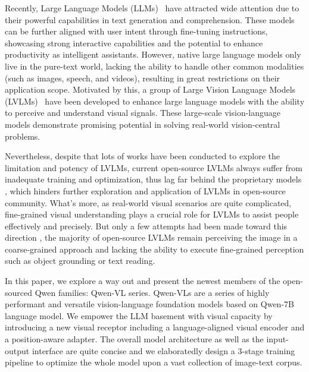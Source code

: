 \documentclass{article}
\begin{document}
Recently, Large Language Models (LLMs)~\citep{gpt3,gpt4,anil2023palm,gao2023llama,qwen7b} have attracted wide attention due to their powerful capabilities in text generation and comprehension. These models can be further aligned with user intent through fine-tuning instructions, showcasing strong interactive capabilities and the potential to enhance productivity as intelligent assistants.
However, native large language models only live in the pure-text world, lacking the ability to handle other common modalities (such as images, speech, and videos), resulting in great restrictions on their application scope.
Motivated by this, a group of Large Vision Language Models (LVLMs)~\citep{alayrac2022flamingo,chen2022pali, blip2,dai2023instructblip,kosmos,kosmos2,zhu2023minigpt,liu2023visual,ye2023mplug,mPLUG-DocOwl,shikra,li2023otter,videollama,emu,gpt4} have been developed to enhance large language models with the ability to perceive and understand visual signals. These large-scale vision-language models demonstrate promising potential in solving real-world vision-central problems.




Nevertheless, despite that lots of works have been conducted to explore the limitation and potency of LVLMs, current open-source LVLMs always suffer from inadequate training and optimization, thus lag far behind the proprietary models \citep{chen2022pali, chen2023pali, gpt4}, which hinders further exploration and application of LVLMs in open-source community.
What's more, as real-world visual scenarios are quite complicated, fine-grained visual understanding plays a crucial role for LVLMs to assist people effectively and precisely.
But only a few attempts had been made toward this direction \citep{kosmos2, shikra}, the majority of open-source LVLMs remain perceiving the image in a coarse-grained approach and lacking the ability to execute fine-grained perception such as object grounding or text reading.

In this paper, we explore a way out and present the newest members of the open-sourced Qwen families: Qwen-VL series.
Qwen-VLs are a series of highly performant and versatile vision-language foundation models based on Qwen-7B \citep{qwen7b} language model.
We empower the LLM basement with visual capacity by introducing a new visual receptor including a language-aligned visual encoder and a position-aware adapter.
The overall model architecture as well as the input-output interface are quite concise and we elaboratedly design a 3-stage training pipeline to optimize the whole model upon a vast collection of image-text corpus.
\end{document}
